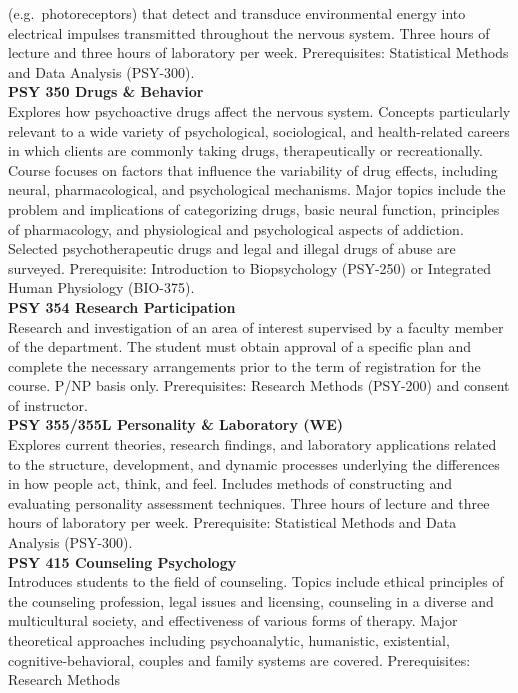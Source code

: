 \documentclass[
  letterpaper,
]{scrbook}
\begin{document}
(e.g.~photoreceptors) that detect and transduce environmental energy
into electrical impulses transmitted throughout the nervous system.
Three hours of lecture and three hours of laboratory per week.
Prerequisites: Statistical Methods and Data Analysis (PSY-300).\\
\textbf{PSY 350 Drugs \& Behavior}\\
Explores how psychoactive drugs affect the nervous system. Concepts
particularly relevant to a wide variety of psychological, sociological,
and health-related careers in which clients are commonly taking drugs,
therapeutically or recreationally. Course focuses on factors that
influence the variability of drug effects, including neural,
pharmacological, and psychological mechanisms. Major topics include the
problem and implications of categorizing drugs, basic neural function,
principles of pharmacology, and physiological and psychological aspects
of addiction. Selected psychotherapeutic drugs and legal and illegal
drugs of abuse are surveyed. Prerequisite: Introduction to Biopsychology
(PSY-250) or Integrated Human Physiology (BIO-375).\\
\textbf{PSY 354 Research Participation}\\
Research and investigation of an area of interest supervised by a
faculty member of the department. The student must obtain approval of a
specific plan and complete the necessary arrangements prior to the term
of registration for the course. P/NP basis only. Prerequisites: Research
Methods (PSY-200) and consent of instructor.\\
\textbf{PSY 355/355L Personality \& Laboratory (WE)}\\
Explores current theories, research findings, and laboratory
applications related to the structure, development, and dynamic
processes underlying the differences in how people act, think, and feel.
Includes methods of constructing and evaluating personality assessment
techniques. Three hours of lecture and three hours of laboratory per
week. Prerequisite: Statistical Methods and Data Analysis (PSY-300).\\
\textbf{PSY 415 Counseling Psychology}\\
Introduces students to the field of counseling. Topics include ethical
principles of the counseling profession, legal issues and licensing,
counseling in a diverse and multicultural society, and effectiveness of
various forms of therapy. Major theoretical approaches including
psychoanalytic, humanistic, existential, cognitive-behavioral, couples
and family systems are covered. Prerequisites: Research Methods
\end{document}
